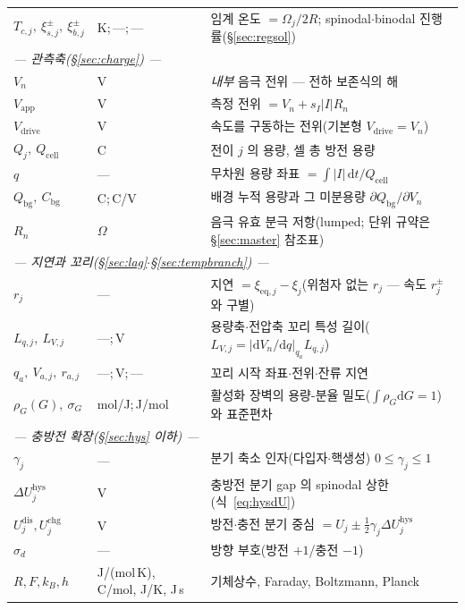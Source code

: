 \documentclass[11pt,a4paper]{article}
\newcommand{\dd}{\mathrm{d}}
\newcommand{\eq}{\mathrm{eq}}
\newcommand{\app}{\mathrm{app}}
\newcommand{\drive}{\mathrm{drive}}
\newcommand{\cell}{\mathrm{cell}}
\newcommand{\bg}{\mathrm{bg}}
\newcommand{\dis}{\mathrm{dis}}
\newcommand{\chg}{\mathrm{chg}}
\newcommand{\hys}{\mathrm{hys}}
\begin{document}
\begin{longtable}{p{} p{} p{}}
$T_{c,j},\ \xi_{s,j}^\pm,\ \xi_{b,j}^\pm$ & {\footnotesize K;\,---;\,---} & 임계 온도 $=\Omega_j/2R$; spinodal$\cdot$binodal 진행률(\S\ref{sec:regsol}) \\
\multicolumn{3}{l}{\emph{— 관측축(\S\ref{sec:charge}) —}}\\
$V_n$ & V & \emph{내부} 음극 전위 — 전하 보존식의 해 \\
$V_\app$ & V & 측정 전위 $=V_n+s_I|I|R_n$ \\
$V_\drive$ & V & 속도를 구동하는 전위(기본형 $V_\drive=V_n$) \\
$Q_j,\ Q_\cell$ & C & 전이 $j$ 의 용량, 셀 총 방전 용량 \\
$q$ & --- & 무차원 용량 좌표 $=\int|I|\,\dd t/Q_\cell$ \\
$Q_\bg,\ C_\bg$ & C;\,C/V & 배경 누적 용량과 그 미분용량 $\partial Q_\bg/\partial V_n$ \\
$R_n$ & $\Omega$ & 음극 유효 분극 저항(lumped; 단위 규약은 \S\ref{sec:master} 참조표) \\
\multicolumn{3}{l}{\emph{— 지연과 꼬리(\S\ref{sec:lag}$\cdot$\S\ref{sec:tempbranch}) —}}\\
$r_j$ & --- & 지연 $=\xi_{\eq,j}-\xi_j$(위첨자 없는 $r_j$ — 속도 $r_j^\pm$ 와 구별) \\
$L_{q,j},\ L_{V,j}$ & ---;\,V & 용량축$\cdot$전압축 꼬리 특성 길이($L_{V,j}=|\dd V_n/\dd q|_{q_a}L_{q,j}$) \\
$q_a,\ V_{a,j},\ r_{a,j}$ & ---;\,V;\,--- & 꼬리 시작 좌표$\cdot$전위$\cdot$잔류 지연 \\
$\rho_G(G),\ \sigma_G$ & mol/J;\,J/mol & 활성화 장벽의 용량-분율 밀도($\int\rho_G\dd G=1$)와 표준편차 \\
\multicolumn{3}{l}{\emph{— 충방전 확장(\S\ref{sec:hys} 이하) —}}\\
$\gamma_j$ & --- & 분기 축소 인자(다입자$\cdot$핵생성) $0\le\gamma_j\le1$ \\
$\Delta U_j^\hys$ & V & 충방전 분기 gap 의 spinodal 상한(식~\eqref{eq:hysdU}) \\
$U_j^{\dis},U_j^{\chg}$ & V & 방전$\cdot$충전 분기 중심 $=U_j\pm\tfrac12\gamma_j\Delta U_j^\hys$ \\
$\sigma_d$ & --- & 방향 부호(방전 $+1$/충전 $-1$) \\
$R,F,k_B,h$ & {\footnotesize J/(mol\,K), C/mol, J/K, J\,s} & 기체상수, Faraday, Boltzmann, Planck \\
\bottomrule
\end{longtable}

\end{document}
